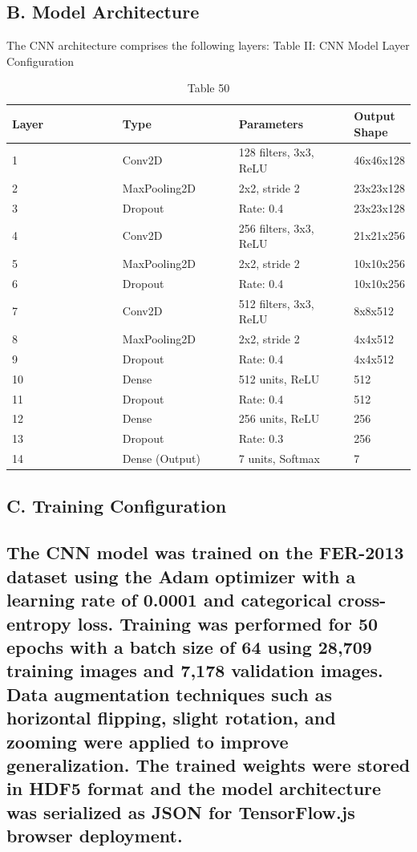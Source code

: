 \documentclass[conference]{IEEEtran}
\begin{document}
\subsection{B. Model Architecture}
The CNN architecture comprises the following layers:
Table II: CNN Model Layer Configuration
\begin{table}[t]
\centering
\caption{Table 50}
\begin{tabular}{|p{0.3\linewidth}|p{0.3\linewidth}|p{0.3\linewidth}|p{0.3\linewidth}|}
\hline
Layer & Type & Parameters & Output Shape \\
\hline
1 & Conv2D & 128 filters, 3x3, ReLU & 46x46x128 \\
\hline
2 & MaxPooling2D & 2x2, stride 2 & 23x23x128 \\
\hline
3 & Dropout & Rate: 0.4 & 23x23x128 \\
\hline
4 & Conv2D & 256 filters, 3x3, ReLU & 21x21x256 \\
\hline
5 & MaxPooling2D & 2x2, stride 2 & 10x10x256 \\
\hline
6 & Dropout & Rate: 0.4 & 10x10x256 \\
\hline
7 & Conv2D & 512 filters, 3x3, ReLU & 8x8x512 \\
\hline
8 & MaxPooling2D & 2x2, stride 2 & 4x4x512 \\
\hline
9 & Dropout & Rate: 0.4 & 4x4x512 \\
\hline
10 & Dense & 512 units, ReLU & 512 \\
\hline
11 & Dropout & Rate: 0.4 & 512 \\
\hline
12 & Dense & 256 units, ReLU & 256 \\
\hline
13 & Dropout & Rate: 0.3 & 256 \\
\hline
14 & Dense (Output) & 7 units, Softmax & 7 \\
\hline
\end{tabular}
\end{table}
\subsection{C. Training Configuration}
\subsection{The CNN model was trained on the FER-2013 dataset using the Adam optimizer with a learning rate of 0.0001 and categorical cross-entropy loss. Training was performed for 50 epochs with a batch size of 64 using 28,709 training images and 7,178 validation images. Data augmentation techniques such as horizontal flipping, slight rotation, and zooming were applied to improve generalization. The trained weights were stored in HDF5 format and the model architecture was serialized as JSON for TensorFlow.js browser deployment.}
\end{document}
